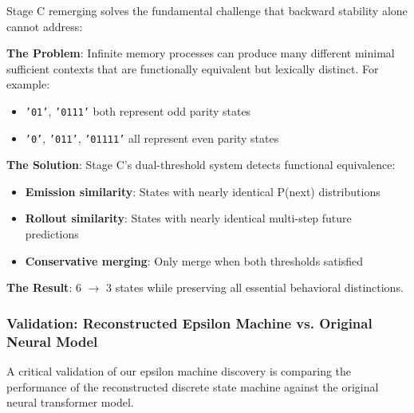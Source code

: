 \documentclass[11pt]{article}
\begin{document}
\begin{notebox}
Stage C remerging solves the fundamental challenge that backward stability alone cannot address:

\textbf{The Problem}: Infinite memory processes can produce many different minimal sufficient contexts that are functionally equivalent but lexically distinct. For example:
\begin{itemize}
\item \texttt{'01'}, \texttt{'0111'} both represent odd parity states
\item \texttt{'0'}, \texttt{'011'}, \texttt{'01111'} all represent even parity states
\end{itemize}

\textbf{The Solution}: Stage C's dual-threshold system detects functional equivalence:
\begin{itemize}
\item \textbf{Emission similarity}: States with nearly identical P(next) distributions
\item \textbf{Rollout similarity}: States with nearly identical multi-step future predictions
\item \textbf{Conservative merging}: Only merge when both thresholds satisfied
\end{itemize}

\textbf{The Result}: 6 $\rightarrow$ 3 states while preserving all essential behavioral distinctions.
\end{notebox}

\subsubsection{Validation: Reconstructed Epsilon Machine vs. Original Neural Model}

A critical validation of our epsilon machine discovery is comparing the performance of the reconstructed discrete state machine against the original neural transformer model.
\end{document}
